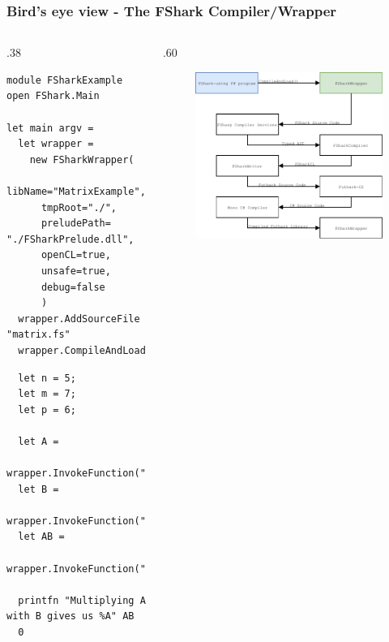 \documentclass[10pt, compress]{beamer}
\begin{document}
\begin{frame}[fragile]
  \frametitle{Bird's eye view - The FShark Compiler/Wrapper}
\begin{columns} %
\begin{column}{.38\textwidth}
\begin{verbatim}
module FSharkExample
open FShark.Main

let main argv =
  let wrapper = 
    new FSharkWrapper(
      libName="MatrixExample",
      tmpRoot="./",
      preludePath= "./FSharkPrelude.dll",
      openCL=true,
      unsafe=true,
      debug=false
      )
  wrapper.AddSourceFile "matrix.fs"
  wrapper.CompileAndLoad
\end{verbatim}
\begin{verbatim}
  let n = 5;
  let m = 7;
  let p = 6;

  let A =
    wrapper.InvokeFunction("replicateRows",n,m);
  let B = 
    wrapper.InvokeFunction("replicateRows",m,p);
  let AB = 
    wrapper.InvokeFunction("multiply",A,B);

  printfn "Multiplying A with B gives us %A" AB
  0
\end{verbatim}
\end{column}
\begin{column}{.60\textwidth}
  \begin{figure}
    \includegraphics[scale=0.7]{./images/pipeline/pipeline2}
  \end{figure}
\end{column}
\end{columns}
\end{frame}
\end{document}
